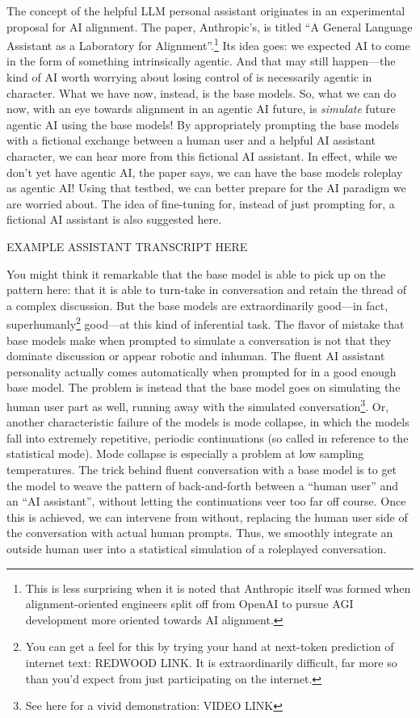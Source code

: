 The concept of the helpful LLM personal assistant originates in an experimental
proposal for AI alignment. The paper, Anthropic's, is titled ``A General
Language Assistant as a Laboratory for
Alignment''\cite{askell2021assistant}.\footnote{This is less surprising when it
is noted that Anthropic itself was formed when alignment-oriented engineers
split off from OpenAI to pursue AGI development more oriented towards AI
alignment.} Its idea goes: we expected AI to come in the form of something
intrinsically agentic. And that may still happen---the kind of AI worth
worrying about losing control of is necessarily agentic in character. What we
have now, instead, is the base models. So, what we can do now, with an eye
towards alignment in an agentic AI future, is \emph{simulate} future agentic AI
using the base models! By appropriately prompting the base models with a
fictional exchange between a human user and a helpful AI assistant character,
we can hear more from this fictional AI assistant. In effect, while we don't
yet have agentic AI, the paper says, we can have the base models roleplay as
agentic AI! Using that testbed, we can better prepare for the AI paradigm we
are worried about. The idea of fine-tuning for, instead of just prompting for,
a fictional AI assistant is also suggested here.

EXAMPLE ASSISTANT TRANSCRIPT HERE

You might think it remarkable that the base model is able to pick up on the
pattern here: that it is able to turn-take in conversation and retain the
thread of a complex discussion. But the base models are extraordinarily
good---in fact, superhumanly\footnote{You can get a feel for this by trying
your hand at next-token prediction of internet text: REDWOOD LINK. It is
extraordinarily difficult, far more so than you'd expect from just
participating on the internet.} good---at this kind of inferential task. The
flavor of mistake that base models make when prompted to simulate a
conversation is not that they dominate discussion or appear robotic and
inhuman. The fluent AI assistant personality actually comes automatically when
prompted for in a good enough base model. The problem is instead that the base
model goes on simulating the human user part as well, running away with the
simulated conversation\footnote{See here for a vivid demonstration: VIDEO
LINK}. Or, another characteristic failure of the models is mode collapse, in
which the models fall into extremely repetitive, periodic continuations (so
called in reference to the statistical mode). Mode collapse is especially a
problem at low sampling temperatures. The trick behind fluent conversation with
a base model is to get the model to weave the pattern of back-and-forth between
a ``human user'' and an ``AI assistant'', without letting the continuations
veer too far off course. Once this is achieved, we can intervene from without,
replacing the human user side of the conversation with actual human prompts.
Thus, we smoothly integrate an outside human user into a statistical simulation
of a roleplayed conversation.


